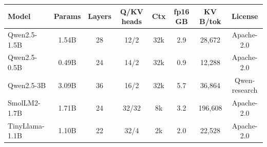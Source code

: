 \begin{tabular}{lccccccc}\toprule Model & Params & Layers & Q/KV heads & Ctx & fp16 GB & KV B/tok & License\\\midrule
Qwen2.5-1.5B & 1.54B & 28 & 12/2 & 32k & 2.9 & 28,672 & Apache-2.0\\
Qwen2.5-0.5B & 0.49B & 24 & 14/2 & 32k & 0.9 & 12,288 & Apache-2.0\\
Qwen2.5-3B & 3.09B & 36 & 16/2 & 32k & 5.7 & 36,864 & Qwen-research\\
SmolLM2-1.7B & 1.71B & 24 & 32/32 & 8k & 3.2 & 196,608 & Apache-2.0\\
TinyLlama-1.1B & 1.10B & 22 & 32/4 & 2k & 2.0 & 22,528 & Apache-2.0\\
\bottomrule\end{tabular}